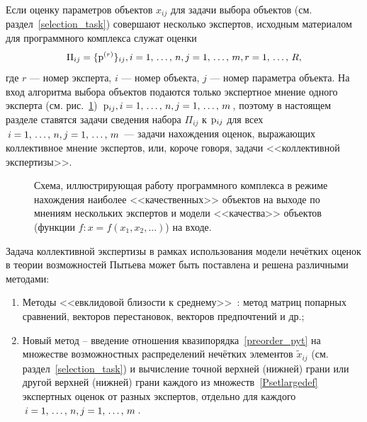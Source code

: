 \label{collective_global}


Если оценку параметров объектов $x_{ij}$ для задачи выбора объектов (см. раздел~\ref{selection_task}) совершают несколько экспертов, исходным материалом для программного комплекса служат оценки 
\begin{equation}
\label{Psetlargedef}
	\Pi_{ij} = \{{\mathrm{p}}^{(r)}\}_{ij}, i = 1,\, \ldots,\, n, j = 1,\, \ldots,\, m, r = 1,\, \ldots,\, R, 
\end{equation}
где $r$ --- номер эксперта, $i$ --- номер объекта, $j$ --- номер параметра объекта. На вход алгоритма выбора объектов подаются только экспертное  мнение одного эксперта (см. рис.~\ref{ris:program_global}) ${\mathrm{p}}_{ij},  i = 1,\, \ldots,\, n, j = 1,\, \ldots,\, m$,  поэтому в настоящем разделе ставятся задачи сведения набора $\Pi_{ij}$ к ${\mathrm{p}}_{ij}$ для всех $i = 1,\, \ldots,\, n, j= 1,\, \ldots,\, m$ --- задачи нахождения  оценок, выражающих коллективное мнение экспертов, или, короче говоря, задачи <<коллективной экспертизы>>. 

\begin{figure}[h]
\caption{\small Схема, иллюстрирующая работу программного комплекса в режиме нахождения наиболее <<качественных>> объектов на выходе по мнениям нескольких экспертов и модели <<качества>> объектов (функции $f: x = f(x_1, x_2, ...)$) на входе. }
\label{ris:program_global}
\end{figure}

Задача коллективной экспертизы в рамках использования модели нечётких оценок в теории возможностей Пытьева может быть поставлена и решена различными методами:
	\begin{enumerate}
		\item Методы <<евклидовой близости к среднему>>~\cite{pytyev_experts}: метод матриц попарных сравнений, векторов перестановок, векторов предпочтений и др.;
		\item Новый метод -- введение отношения квазипорядка~\ref{preorder_pyt}  на множестве возможностных распределений нечётких  элементов $\tilde x_{ij}$ (см. раздел~\ref{selection_task}) и вычисление точной верхней (нижней) грани или другой верхней (нижней) грани каждого из множеств~\ref{Psetlargedef} экспертных оценок от разных экспертов, отдельно для каждого $i = 1,\, \ldots,\, n, j= 1,\, \ldots,\, m$.
	\end{enumerate} 
	

